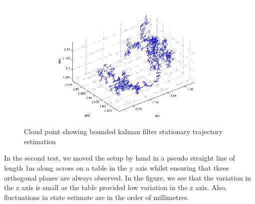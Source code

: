 \documentclass[]{article}
\begin{document}
{\begin{figure}[H]
	\begin{center}
		\includegraphics[width = \textwidth]{stationaryTraj.png}
	\end{center}
	\caption{Cloud point showing bounded kalman filter stationary trajectory estimation}
	\label{fig:stationary_trajectory}
\end{figure}
In the second test, we moved the setup by hand in a pseudo straight line of length 1m along across on a table in the y axis whilst ensuring that three orthogonal planes are always observed. In the figure, we see that the variation in the z axis is small as the table provided low variation in the z axis. Also, fluctuations in state estimate are in the order of millimetres.

}
\end{document}
